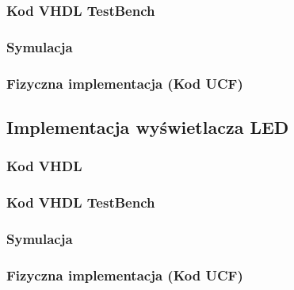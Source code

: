 \documentclass[a4paper,12pt]{extarticle}  %
\begin{document}
\subsubsection{Kod VHDL TestBench}

\subsubsection{Symulacja}
\begin{figure}[H]
   \centering
\end{figure}
\subsubsection{Fizyczna implementacja (Kod UCF)}

\subsection{Implementacja wyświetlacza LED}
\subsubsection{Kod VHDL}

\subsubsection{Kod VHDL TestBench}

\subsubsection{Symulacja}
\begin{figure}[H]
   \centering
\end{figure}
\subsubsection{Fizyczna implementacja (Kod UCF)}

\end{document}
